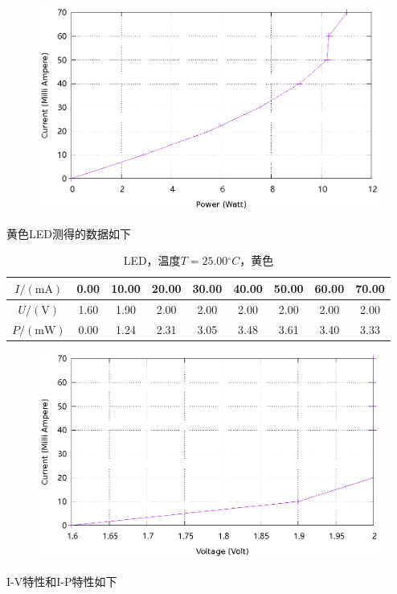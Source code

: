 \documentclass{ctexart}
\newcommand{\si}[1]{\mathrm{#1}}
\begin{document}
\begin{figure}[H]
  \centering
  \includegraphics[width=0.8\linewidth]{optics-figures/led-pc-2.gnuplot}
\end{figure}

\newpage
黄色LED测得的数据如下

\begin{table}[H]
  \centering
  \begin{tabular}{|c|c|c|c|c|c|c|c|c|}
    \hline
    $I/(\si{mA})$   & 0.00 & 10.00 & 20.00 & 30.00 & 40.00 & 50.00 & 60.00 & 70.00 \\\hline
    $U / (\si{V})$  & 1.60 & 1.90 & 2.00 & 2.00 & 2.00 & 2.00 & 2.00 & 2.00 \\\hline
    $P / (\si{mW})$ & 0.00 & 1.24 & 2.31 & 3.05 & 3.48 & 3.61 & 3.40 & 3.33 \\\hline
  \end{tabular}
  \caption{LED，温度$T=25.00{}^{\circ}C$，黄色}
\end{table}

\begin{figure}[H]
  \centering
  \includegraphics[width=0.8\linewidth]{optics-figures/led-vc-3.gnuplot}
\end{figure}

I-V特性和I-P特性如下
\end{document}
